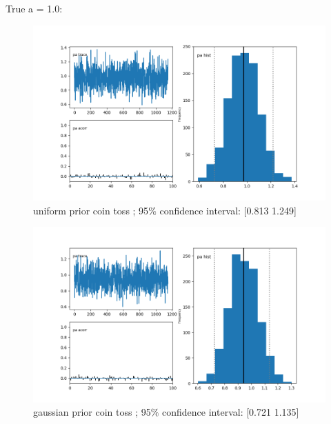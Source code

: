 \documentclass[a4paper,11pt,english]{article}
\begin{document}
\par True a = 1.0:
\begin{figure}[H]
	
	\includegraphics[width=\linewidth]{lighthouse/a_unif}
	uniform prior coin toss ;   95$\%$ confidence interval:  [0.813 1.249]
	
		
	\includegraphics[width=\linewidth]{lighthouse/a_gauss}
	gaussian prior coin toss ;  95$\%$ confidence interval: 
[0.721 1.135]


\end{figure}
\end{document}
